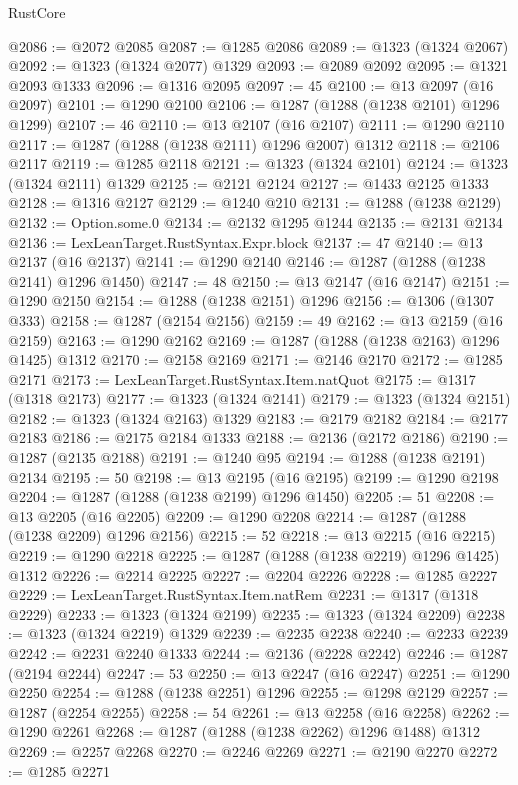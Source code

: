 \begin{lexlean}{RustCore}
\begin{coremodule}
@2086 := @2072 @2085
@2087 := @1285 @2086
@2089 := @1323 (@1324 @2067)
@2092 := @1323 (@1324 @2077) @1329
@2093 := @2089 @2092
@2095 := @1321 @2093 @1333
@2096 := @1316 @2095
@2097 := 45
@2100 := @13 @2097 (@16 @2097)
@2101 := @1290 @2100
@2106 := @1287 (@1288 (@1238 @2101) @1296 @1299)
@2107 := 46
@2110 := @13 @2107 (@16 @2107)
@2111 := @1290 @2110
@2117 := @1287 (@1288 (@1238 @2111) @1296 @2007) @1312
@2118 := @2106 @2117
@2119 := @1285 @2118
@2121 := @1323 (@1324 @2101)
@2124 := @1323 (@1324 @2111) @1329
@2125 := @2121 @2124
@2127 := @1433 @2125 @1333
@2128 := @1316 @2127
@2129 := @1240 @210
@2131 := @1288 (@1238 @2129)
@2132 := Option.some.{0}
@2134 := @2132 @1295 @1244
@2135 := @2131 @2134
@2136 := LexLeanTarget.RustSyntax.Expr.block
@2137 := 47
@2140 := @13 @2137 (@16 @2137)
@2141 := @1290 @2140
@2146 := @1287 (@1288 (@1238 @2141) @1296 @1450)
@2147 := 48
@2150 := @13 @2147 (@16 @2147)
@2151 := @1290 @2150
@2154 := @1288 (@1238 @2151) @1296
@2156 := @1306 (@1307 @333)
@2158 := @1287 (@2154 @2156)
@2159 := 49
@2162 := @13 @2159 (@16 @2159)
@2163 := @1290 @2162
@2169 := @1287 (@1288 (@1238 @2163) @1296 @1425) @1312
@2170 := @2158 @2169
@2171 := @2146 @2170
@2172 := @1285 @2171
@2173 := LexLeanTarget.RustSyntax.Item.natQuot
@2175 := @1317 (@1318 @2173)
@2177 := @1323 (@1324 @2141)
@2179 := @1323 (@1324 @2151)
@2182 := @1323 (@1324 @2163) @1329
@2183 := @2179 @2182
@2184 := @2177 @2183
@2186 := @2175 @2184 @1333
@2188 := @2136 (@2172 @2186)
@2190 := @1287 (@2135 @2188)
@2191 := @1240 @95
@2194 := @1288 (@1238 @2191) @2134
@2195 := 50
@2198 := @13 @2195 (@16 @2195)
@2199 := @1290 @2198
@2204 := @1287 (@1288 (@1238 @2199) @1296 @1450)
@2205 := 51
@2208 := @13 @2205 (@16 @2205)
@2209 := @1290 @2208
@2214 := @1287 (@1288 (@1238 @2209) @1296 @2156)
@2215 := 52
@2218 := @13 @2215 (@16 @2215)
@2219 := @1290 @2218
@2225 := @1287 (@1288 (@1238 @2219) @1296 @1425) @1312
@2226 := @2214 @2225
@2227 := @2204 @2226
@2228 := @1285 @2227
@2229 := LexLeanTarget.RustSyntax.Item.natRem
@2231 := @1317 (@1318 @2229)
@2233 := @1323 (@1324 @2199)
@2235 := @1323 (@1324 @2209)
@2238 := @1323 (@1324 @2219) @1329
@2239 := @2235 @2238
@2240 := @2233 @2239
@2242 := @2231 @2240 @1333
@2244 := @2136 (@2228 @2242)
@2246 := @1287 (@2194 @2244)
@2247 := 53
@2250 := @13 @2247 (@16 @2247)
@2251 := @1290 @2250
@2254 := @1288 (@1238 @2251) @1296
@2255 := @1298 @2129
@2257 := @1287 (@2254 @2255)
@2258 := 54
@2261 := @13 @2258 (@16 @2258)
@2262 := @1290 @2261
@2268 := @1287 (@1288 (@1238 @2262) @1296 @1488) @1312
@2269 := @2257 @2268
@2270 := @2246 @2269
@2271 := @2190 @2270
@2272 := @1285 @2271

\end{coremodule}
\end{lexlean}

